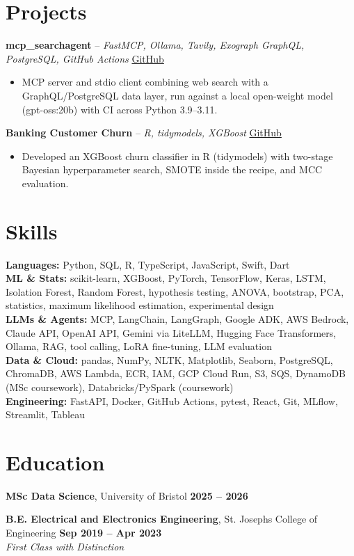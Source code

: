 \documentclass[a4paper,10pt]{article}
\begin{document}
\section{Projects}
\noindent\textbf{mcp\_searchagent} -- \textit{FastMCP, Ollama, Tavily, Exograph GraphQL, PostgreSQL, GitHub Actions} \hfill \href{https://github.com/Thiruvel-AP/mcp_searchagent}{GitHub}
\begin{itemize}
  \item MCP server and stdio client combining web search with a GraphQL/PostgreSQL data layer, run against a local open-weight model (gpt-oss:20b) with CI across Python 3.9–3.11.
\end{itemize}
\noindent\textbf{Banking Customer Churn} -- \textit{R, tidymodels, XGBoost} \hfill \href{https://github.com/Thiruvel-AP/Banking-Customer-Churn-Prediction}{GitHub}
\begin{itemize}
  \item Developed an XGBoost churn classifier in R (tidymodels) with two-stage Bayesian hyperparameter search, SMOTE inside the recipe, and MCC evaluation.
\end{itemize}

\section{Skills}
\textbf{Languages:} Python, SQL, R, TypeScript, JavaScript, Swift, Dart\\
\textbf{ML \& Stats:} scikit-learn, XGBoost, PyTorch, TensorFlow, Keras, LSTM, Isolation Forest, Random Forest, hypothesis testing, ANOVA, bootstrap, PCA, statistics, maximum likelihood estimation, experimental design\\
\textbf{LLMs \& Agents:} MCP, LangChain, LangGraph, Google ADK, AWS Bedrock, Claude API, OpenAI API, Gemini via LiteLLM, Hugging Face Transformers, Ollama, RAG, tool calling, LoRA fine-tuning, LLM evaluation\\
\textbf{Data \& Cloud:} pandas, NumPy, NLTK, Matplotlib, Seaborn, PostgreSQL, ChromaDB, AWS Lambda, ECR, IAM, GCP Cloud Run, S3, SQS, DynamoDB (MSc coursework), Databricks/PySpark (coursework)\\
\textbf{Engineering:} FastAPI, Docker, GitHub Actions, pytest, React, Git, MLflow, Streamlit, Tableau

\section{Education}
\textbf{MSc Data Science}, University of Bristol \hfill \textbf{2025 – 2026}\par
\vspace{2pt}
\textbf{B.E. Electrical and Electronics Engineering}, St. Joseph\textquotesingle{}s College of Engineering \hfill \textbf{Sep 2019 – Apr 2023}\\ \textit{First Class with Distinction}\par
\end{document}
